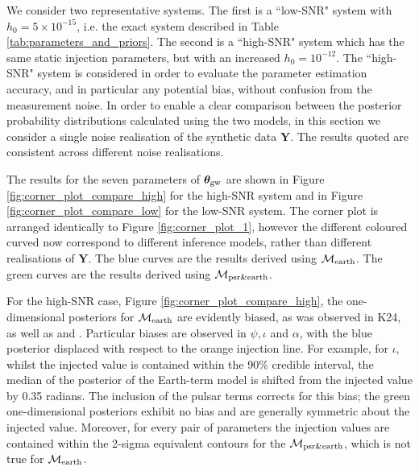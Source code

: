 \documentclass[fleqn,usenatbib,useAMS]{mnras}
\begin{document}
We consider two representative systems. The first is a ``low-SNR" system with $h_0 = 5 \times 10^{-15}$, i.e. the exact system described in Table \ref{tab:parameters_and_priors}. The second is a ``high-SNR" system which has the same static injection parameters, but with an increased $h_0 = 10^{-12}$. The ``high-SNR" system is considered in order to evaluate the parameter estimation accuracy, and in particular any potential bias, without confusion from the measurement noise. In order to enable a clear comparison between the posterior probability distributions calculated using the two models, in this section we consider a single noise realisation of the synthetic data $\boldsymbol{Y}$. The results quoted are consistent across different noise realisations. \newline 


The results for the seven parameters of  $\boldsymbol{\theta}_{\rm gw}$ are shown in Figure \ref{fig:corner_plot_compare_high} for the high-SNR system and in Figure \ref{fig:corner_plot_compare_low} for the low-SNR system. The corner plot is arranged identically to Figure \ref{fig:corner_plot_1}, however the different coloured curved now correspond to different inference models, rather than different realisations of $\boldsymbol{Y}$. The blue curves are the results derived using $\mathcal{M}_{\rm earth}$. The green curves are the results derived using $\mathcal{M}_{\rm psr \& earth}$. \newline 
		
For the high-SNR case, Figure \ref{fig:corner_plot_compare_high}, the one-dimensional posteriors for $\mathcal{M}_{\rm earth}$ are evidently biased, as was observed in K24, as well as \cite{Zhupulsarterms} and \cite{Chen2022}. Particular biases are observed in $\psi, \iota $ and $\alpha$, with the blue posterior displaced with respect to the orange injection line. For example, for $\iota$, whilst the injected value is contained within the 90\% credible interval, the median of the posterior of the Earth-term model is shifted from the injected value by 0.35 radians. The inclusion of the pulsar terms corrects for this bias; the green one-dimensional posteriors exhibit no bias and are generally symmetric about the injected value. Moreover, for every pair of parameters the injection values are contained within the 2-sigma equivalent contours for the $\mathcal{M}_{\rm psr \& earth}$, which is not true for $\mathcal{M}_{\rm earth}$. \newline 
\end{document}
